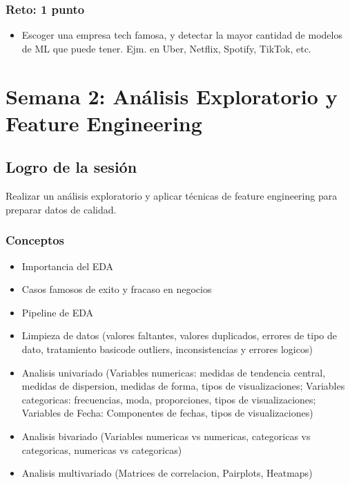 \documentclass[12pt,a4paper,openany,oneside]{book}
\begin{document}
\begin{itemize}
\subsection{Reto: 1 punto}
\begin{itemize}
    \item Escoger una empresa tech famosa, y detectar la mayor cantidad de modelos de ML que puede tener. Ejm. en Uber, Netflix, Spotify, TikTok, etc.
\end{itemize}

\chapter{Semana 2: Análisis Exploratorio y Feature Engineering}

\section{Logro de la sesión}
Realizar un análisis exploratorio y aplicar técnicas de feature engineering para preparar datos de calidad.

\subsection{Conceptos}
\begin{itemize}
    \item Importancia del EDA
    \item Casos famosos de exito y fracaso en negocios
    \item Pipeline de EDA
    \item Limpieza de datos (valores faltantes, valores duplicados, errores de tipo de dato, tratamiento basicode outliers, inconsistencias y errores logicos)
    \item Analisis univariado (Variables numericas: medidas de tendencia central, medidas de dispersion, medidas de forma, tipos de visualizaciones; Variables categoricas: frecuencias, moda, proporciones, tipos de visualizaciones; Variables de Fecha: Componentes de fechas, tipos de visualizaciones)
    \item Analisis bivariado (Variables numericas vs numericas, categoricas vs categoricas, numericas vs categoricas)
    \item Analisis multivariado (Matrices de correlacion, Pairplots, Heatmaps)


\end{itemize}
\end{itemize}
\end{document}
